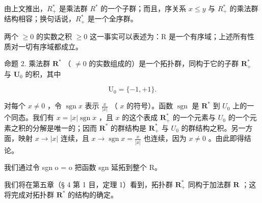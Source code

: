 由上文推出，\(R_{+}^{*}\) 是乘法群 \(R^{*}\) 的一个子群；而且，序关系 \(x \leqslant y\) 与 \(R_{+}^{*}\) 的乘法群结构相容；换句话说，\(R_{+}^{*}\) 是一个全序群。

两个 \(\geqslant0\) 的实数之积 \(\geqslant0\) 这一事实可以表述为：R 是一个有序域；上述所有性质对一切有序域都成立。

命题 2. 乘法群 \(\mathbf{R}^{*}\) （ \(\neq 0\) 的实数组成的）是一个拓扑群，同构于它的子群 \(\mathbf{R}_{+}^{*}\) 与 \(\mathbf{U}_{0}\) 的积，其中

\[
\mathrm{U} _ {0} = \{- 1, + 1 \}.
\]

对每个 \(x \neq 0\) ，令 \(\operatorname{sgn} x\) 表示 \(\frac{x}{|x|}\) （ \(x\) 的符号）。函数 \(\operatorname{sgn}\) 是 \(\mathbf{R}^*\) 到 \(U_0\) 上的一个同态。我们有 \(x = |x| \operatorname{sgn} x\) ，且 \(x\) 的这个表成 \(\mathbf{R}_+^*\) 的一个元素与 \(U_0\) 的一个元素之积的分解是唯一的；因而 \(\mathbf{R}^*\) 的群结构是 \(\mathbf{R}_+^*\) 与 \(U_0\) 的群结构之积。另一方面，映射 \(x \to |x|\) 连续，且 \(x \to \operatorname{sgn} x = \frac{x}{|x|}\) 也连续，因为 \(x \neq 0\) 。由此即得结论。

我们通过令 sgn o = o 把函数 sgn 延拓到整个 R。

我们将在第五章（§ 4 第 1 目，定理 1）看到，拓扑群 \(\mathbf{R}_{+}^{*}\) 同构于加法群 \(\mathbf{R}\) ；这将完成对拓扑群 \(\mathbf{R}^{*}\) 的结构的确定。

